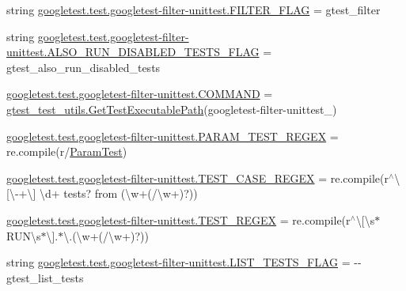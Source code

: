 \begin{DoxyCompactItemize}
\item 
string \mbox{\hyperlink{namespacegoogletest_1_1test_1_1googletest-filter-unittest_a9d2ad5cbbdc1eb9d16366deedc218d0c}{googletest.\+test.\+googletest-\/filter-\/unittest.\+F\+I\+L\+T\+E\+R\+\_\+\+F\+L\+AG}} = \textquotesingle{}gtest\+\_\+filter\textquotesingle{}
\item 
string \mbox{\hyperlink{namespacegoogletest_1_1test_1_1googletest-filter-unittest_a1214e1e0bf0e4d18dd17a2ae9db941be}{googletest.\+test.\+googletest-\/filter-\/unittest.\+A\+L\+S\+O\+\_\+\+R\+U\+N\+\_\+\+D\+I\+S\+A\+B\+L\+E\+D\+\_\+\+T\+E\+S\+T\+S\+\_\+\+F\+L\+AG}} = \textquotesingle{}gtest\+\_\+also\+\_\+run\+\_\+disabled\+\_\+tests\textquotesingle{}
\item 
\mbox{\hyperlink{namespacegoogletest_1_1test_1_1googletest-filter-unittest_a12a6fadcdd4067a0c25b0c02629f128d}{googletest.\+test.\+googletest-\/filter-\/unittest.\+C\+O\+M\+M\+A\+ND}} = \mbox{\hyperlink{namespacegtest__test__utils_a89ed3717984a80ffbb7a9c92f71b86a2}{gtest\+\_\+test\+\_\+utils.\+Get\+Test\+Executable\+Path}}(\textquotesingle{}googletest-\/filter-\/unittest\+\_\+\textquotesingle{})
\item 
\mbox{\hyperlink{namespacegoogletest_1_1test_1_1googletest-filter-unittest_af75c023cf734750cc9a18436114c2282}{googletest.\+test.\+googletest-\/filter-\/unittest.\+P\+A\+R\+A\+M\+\_\+\+T\+E\+S\+T\+\_\+\+R\+E\+G\+EX}} = re.\+compile(r\textquotesingle{}/\mbox{\hyperlink{class_param_test}{Param\+Test}}\textquotesingle{})
\item 
\mbox{\hyperlink{namespacegoogletest_1_1test_1_1googletest-filter-unittest_a9aa6da1265cde49c7c44374d71b9d54c}{googletest.\+test.\+googletest-\/filter-\/unittest.\+T\+E\+S\+T\+\_\+\+C\+A\+S\+E\+\_\+\+R\+E\+G\+EX}} = re.\+compile(r\textquotesingle{}$^\wedge$\textbackslash{}\mbox{[}\textbackslash{}-\/+\textbackslash{}\mbox{]} \textbackslash{}d+ tests? from (\textbackslash{}w+(/\textbackslash{}w+)?)\textquotesingle{})
\item 
\mbox{\hyperlink{namespacegoogletest_1_1test_1_1googletest-filter-unittest_ac9719892052bb0bd47e89c160581d3f5}{googletest.\+test.\+googletest-\/filter-\/unittest.\+T\+E\+S\+T\+\_\+\+R\+E\+G\+EX}} = re.\+compile(r\textquotesingle{}$^\wedge$\textbackslash{}\mbox{[}\textbackslash{}s$\ast$R\+U\+N\textbackslash{}s$\ast$\textbackslash{}\mbox{]}.$\ast$\textbackslash{}.(\textbackslash{}w+(/\textbackslash{}w+)?)\textquotesingle{})
\item 
string \mbox{\hyperlink{namespacegoogletest_1_1test_1_1googletest-filter-unittest_a92d0761e3bcb020dfdcbcb049215667a}{googletest.\+test.\+googletest-\/filter-\/unittest.\+L\+I\+S\+T\+\_\+\+T\+E\+S\+T\+S\+\_\+\+F\+L\+AG}} = \textquotesingle{}-\/-\/gtest\+\_\+list\+\_\+tests\textquotesingle{}

\end{DoxyCompactItemize}
